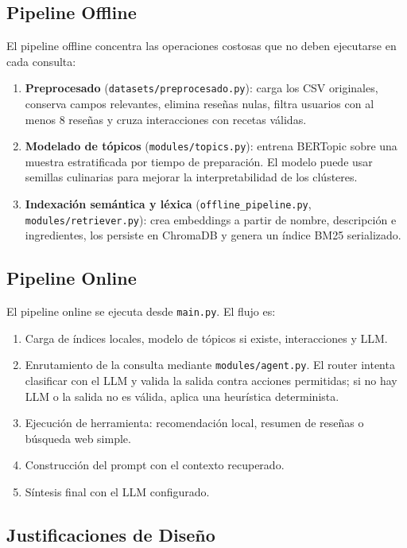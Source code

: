 \documentclass[11pt,a4paper]{article}
\begin{document}
\subsection{Pipeline Offline}

El pipeline offline concentra las operaciones costosas que no deben ejecutarse en cada consulta:
\begin{enumerate}
    \item \textbf{Preprocesado} (\texttt{datasets/preprocesado.py}): carga los CSV originales, conserva campos relevantes, elimina reseñas nulas, filtra usuarios con al menos 8 reseñas y cruza interacciones con recetas válidas.
    \item \textbf{Modelado de tópicos} (\texttt{modules/topics.py}): entrena BERTopic sobre una muestra estratificada por tiempo de preparación. El modelo puede usar semillas culinarias para mejorar la interpretabilidad de los clústeres.
    \item \textbf{Indexación semántica y léxica} (\texttt{offline\_pipeline.py}, \texttt{modules/retriever.py}): crea embeddings a partir de nombre, descripción e ingredientes, los persiste en ChromaDB y genera un índice BM25 serializado.
\end{enumerate}

\subsection{Pipeline Online}

El pipeline online se ejecuta desde \texttt{main.py}. El flujo es:
\begin{enumerate}
    \item Carga de índices locales, modelo de tópicos si existe, interacciones y LLM.
    \item Enrutamiento de la consulta mediante \texttt{modules/agent.py}. El router intenta clasificar con el LLM y valida la salida contra acciones permitidas; si no hay LLM o la salida no es válida, aplica una heurística determinista.
    \item Ejecución de herramienta: recomendación local, resumen de reseñas o búsqueda web simple.
    \item Construcción del prompt con el contexto recuperado.
    \item Síntesis final con el LLM configurado.
\end{enumerate}

\subsection{Justificaciones de Diseño}
\end{document}
